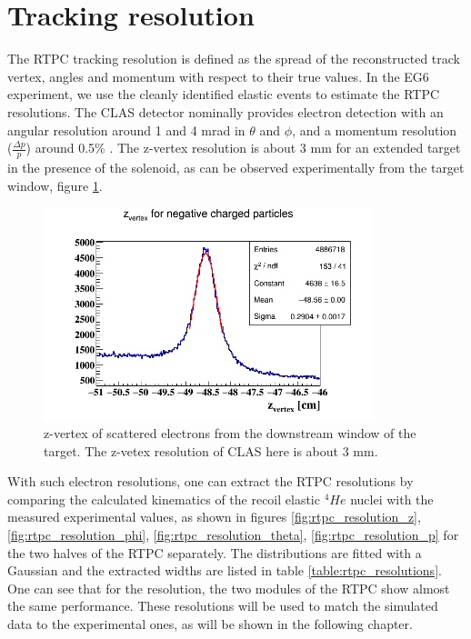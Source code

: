 \section{Tracking resolution}
The RTPC tracking resolution is defined as the spread of the reconstructed 
track vertex, angles and momentum with respect to their true values. In the EG6 
experiment, we use the cleanly identified elastic events to estimate the RTPC 
resolutions. The CLAS detector nominally provides electron detection with an 
angular resolution around 1 and 4 mrad in $\theta$ and $\phi$, and a momentum 
resolution ($\frac{\Delta p}{p}$) around 0.5$\%$ \cite{CLASref}. The z-vertex 
resolution is about 3 mm for an extended target in the presence of the 
solenoid, as can be observed experimentally from the target window, figure 
\ref{fig:electron_z_vertex_res}. 
\begin{figure}[tbp]
   \centering
   \includegraphics[height=6.2cm]{fig_rtpc/clas_z_resolution.png}
   \caption{ z-vertex of scattered electrons from the downstream window of the 
   target. The z-vetex resolution of CLAS here is about 3 mm.}
   \label{fig:electron_z_vertex_res}
\end{figure}

With such electron resolutions, one can extract the RTPC resolutions by 
comparing the calculated kinematics of the recoil elastic $^4He$ nuclei  with 
the measured experimental values, as shown in figures 
\ref{fig:rtpc_resolution_z}, \ref{fig:rtpc_resolution_phi}, 
\ref{fig:rtpc_resolution_theta}, \ref{fig:rtpc_resolution_p} for the two halves 
of the RTPC separately. The distributions are fitted with a Gaussian and the 
extracted widths are listed in table \ref{table:rtpc_resolutions}.  One can see 
that for the resolution, the two modules of the RTPC show almost the same 
performance. These resolutions will be used to match the simulated data to the 
experimental ones, as will be shown in the following chapter.

